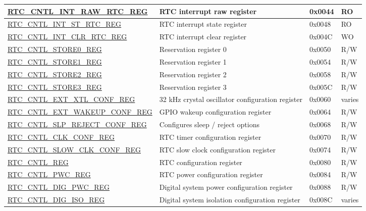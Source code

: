\begin{longtable}{ | l | p{7cm} | p{1.3cm} | p{1cm} | }
\hyperref[regdesc:RTCCNTLINTRAWRTCREG]{RTC\_CNTL\_INT\_RAW\_RTC\_REG} & RTC interrupt raw register & 0x0044 & RO \\ \hline
\hyperref[regdesc:RTCCNTLINTSTRTCREG]{RTC\_CNTL\_INT\_ST\_RTC\_REG} & RTC interrupt state register & 0x0048 & RO \\ \hline
\hyperref[regdesc:RTCCNTLINTCLRRTCREG]{RTC\_CNTL\_INT\_CLR\_RTC\_REG} & RTC interrupt clear register & 0x004C & WO \\ \hline
\hyperref[regdesc:RTCCNTLSTORE0REG]{RTC\_CNTL\_STORE0\_REG} & Reservation register 0 & 0x0050 & R/W \\ \hline
\hyperref[regdesc:RTCCNTLSTORE1REG]{RTC\_CNTL\_STORE1\_REG} & Reservation register 1 & 0x0054 & R/W \\ \hline
\hyperref[regdesc:RTCCNTLSTORE2REG]{RTC\_CNTL\_STORE2\_REG} & Reservation register 2 & 0x0058 & R/W \\ \hline
\hyperref[regdesc:RTCCNTLSTORE3REG]{RTC\_CNTL\_STORE3\_REG} & Reservation register 3 & 0x005C & R/W \\ \hline
\hyperref[regdesc:RTCCNTLEXTXTLCONFREG]{RTC\_CNTL\_EXT\_XTL\_CONF\_REG} & 32 kHz crystal oscillator configuration register & 0x0060 & varies \\ \hline
\hyperref[regdesc:RTCCNTLEXTWAKEUPCONFREG]{RTC\_CNTL\_EXT\_WAKEUP\_CONF\_REG} & GPIO wakeup configuration register & 0x0064 & R/W \\ \hline
\hyperref[regdesc:RTCCNTLSLPREJECTCONFREG]{RTC\_CNTL\_SLP\_REJECT\_CONF\_REG} & Configures sleep / reject options & 0x0068 & R/W \\ \hline
\hyperref[regdesc:RTCCNTLCLKCONFREG]{RTC\_CNTL\_CLK\_CONF\_REG} & RTC timer configuration register & 0x0070 & R/W \\ \hline
\hyperref[regdesc:RTCCNTLSLOWCLKCONFREG]{RTC\_CNTL\_SLOW\_CLK\_CONF\_REG} & RTC slow clock configuration register & 0x0074 & R/W \\ \hline
\hyperref[regdesc:RTCCNTLREG]{RTC\_CNTL\_REG} & RTC configuration register & 0x0080 & R/W \\ \hline
\hyperref[regdesc:RTCCNTLPWCREG]{RTC\_CNTL\_PWC\_REG} & RTC power configuration register & 0x0084 & R/W \\ \hline
\hyperref[regdesc:RTCCNTLDIGPWCREG]{RTC\_CNTL\_DIG\_PWC\_REG} & Digital system power configuration register & 0x0088 & R/W \\ \hline
\hyperref[regdesc:RTCCNTLDIGISOREG]{RTC\_CNTL\_DIG\_ISO\_REG} & Digital system isolation configuration register & 0x008C & varies \\ \hline

\end{longtable}
